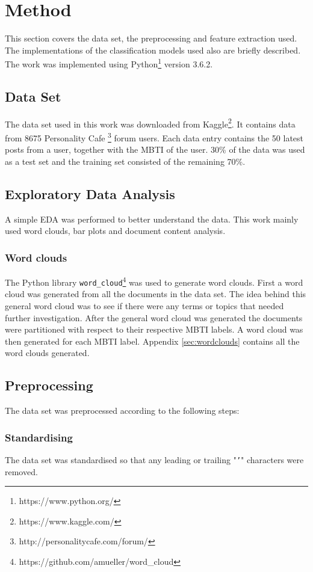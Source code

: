 \section{Method} \label{sec:method}

This section covers the data set, the preprocessing and feature extraction used.
The implementations of the classification models used also are briefly described.
The work was implemented using Python\footnote{https://www.python.org/} version 3.6.2.
\subsection{Data Set}
The data set used in this work was downloaded from Kaggle\footnote{https://www.kaggle.com/}.
It contains data from 8675 Personality Cafe \footnote{http://personalitycafe.com/forum/} forum users.
Each data entry contains the 50 latest posts from a user, together with the MBTI of the user.
30\% of the data was used as a test set and the training set consisted of the remaining 70\%.

\subsection{Exploratory Data Analysis}
A simple EDA was performed to better understand the data.
This work mainly used word clouds, bar plots and document content analysis.

\subsubsection{Word clouds}
The Python library \texttt{word\_cloud}\footnote{https://github.com/amueller/word\_cloud} was used to generate word clouds.
First a word cloud was generated from all the documents in the data set.
The idea behind this general word cloud was to see if there were any terms or topics that needed further investigation.
After the general word cloud was generated the documents were partitioned with respect to their respective MBTI labels.
A word cloud was then generated for each MBTI label.
Appendix \ref{sec:wordclouds} contains all the word clouds generated.

\subsection{Preprocessing} \label{sec:method-preprocessing} 
The data set was preprocessed according to the following steps:

\subsubsection{Standardising}
The data set was standardised so that any leading or trailing "\texttt{'}" characters were removed.

